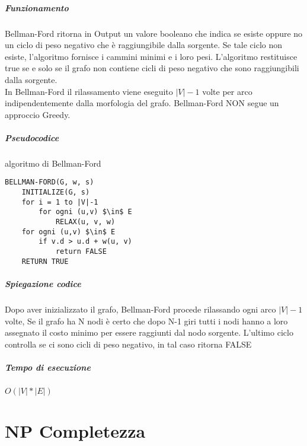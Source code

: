 \documentclass[12pt, a4paper, openany]{book}
\begin{document}
\paragraph{Funzionamento}
Bellman-Ford ritorna in Output un valore booleano che indica se esiste oppure no un ciclo di peso
negativo che è raggiungibile dalla sorgente. Se tale ciclo non esiste, l'algoritmo fornisce i cammini minimi
e i loro pesi. L'algoritmo restituisce true se e solo se il grafo non contiene cicli di peso negativo che sono
raggiungibili dalla sorgente.\\
In Bellman-Ford il rilassamento viene eseguito $|V|-1$ volte per arco indipendentemente dalla morfologia del grafo.
Bellman-Ford NON segue un approccio Greedy.

\paragraph{Pseudocodice} algoritmo di Bellman-Ford
\begin{lstlisting}
BELLMAN-FORD(G, w, s)
    INITIALIZE(G, s)
    for i = 1 to |V|-1
        for ogni (u,v) $\in$ E
            RELAX(u, v, w)
    for ogni (u,v) $\in$ E
        if v.d > u.d + w(u, v)
            return FALSE
    RETURN TRUE
\end{lstlisting}

\paragraph{Spiegazione codice}
Dopo aver inizializzato il grafo, Bellman-Ford procede rilassando ogni arco $|V|-1$ volte,
Se il grafo ha N nodi è certo che dopo N-1 giri tutti i nodi hanno a loro assegnato il costo minimo per essere raggiunti dal nodo sorgente.
L'ultimo ciclo controlla se ci sono cicli di peso negativo, in tal caso ritorna FALSE

\paragraph{Tempo di esecuzione}
\begin{center}
	$O(|V|*|E|)$
\end{center}

\chapter{NP Completezza} %
\end{document}
